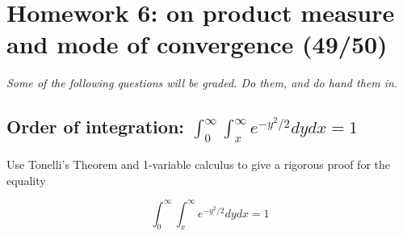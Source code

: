\chapter{Homework 6: on product measure and mode of convergence (49/50)}\label{homework-6-on-product-measure-and-mode-of-convergence-4950}

\emph{Some of the following questions will be graded. Do them, and do hand them in}.

\section{\texorpdfstring{Order of integration: \(\int_{0}^{\infty}\int_{x}^{\infty}e^{- y^{2}/2} dy dx = 1\)}{Order of integration: \textbackslash int\_\{0\}\^{}\{\textbackslash infty\}\textbackslash int\_\{x\}\^{}\{\textbackslash infty\}e\^{}\{- y\^{}\{2\}/2\} dy dx = 1}}\label{order-of-integration-int_0inftyint_xinfty-e-y22d-y-d-x1}

Use Tonelli's Theorem and 1-variable calculus to give a rigorous proof for the equality

\[\int_{0}^{\infty}\int_{x}^{\infty}e^{- y^{2}/2} dy dx = 1\]

